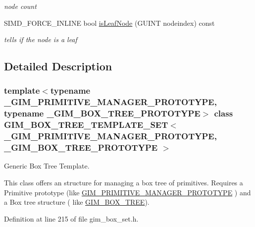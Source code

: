 \begin{Indent}{\bf }
\begin{CompactItemize}
\begin{CompactList}\small\item\em node count \item\end{CompactList}\item 
\hypertarget{class_g_i_m___b_o_x___t_r_e_e___t_e_m_p_l_a_t_e___s_e_t_509b1d5bf9af2486aae90e8d56993092}{
SIMD\_\-FORCE\_\-INLINE bool \hyperlink{class_g_i_m___b_o_x___t_r_e_e___t_e_m_p_l_a_t_e___s_e_t_509b1d5bf9af2486aae90e8d56993092}{isLeafNode} (GUINT nodeindex) const }
\label{class_g_i_m___b_o_x___t_r_e_e___t_e_m_p_l_a_t_e___s_e_t_509b1d5bf9af2486aae90e8d56993092}

\begin{CompactList}\small\item\em tells if the node is a leaf \item\end{CompactList}\end{CompactItemize}
\end{Indent}


\subsection{Detailed Description}
\subsubsection*{template$<$typename \_\-GIM\_\-PRIMITIVE\_\-MANAGER\_\-PROTOTYPE, typename \_\-GIM\_\-BOX\_\-TREE\_\-PROTOTYPE$>$ class GIM\_\-BOX\_\-TREE\_\-TEMPLATE\_\-SET$<$ \_\-GIM\_\-PRIMITIVE\_\-MANAGER\_\-PROTOTYPE, \_\-GIM\_\-BOX\_\-TREE\_\-PROTOTYPE $>$}

Generic Box Tree Template. 

This class offers an structure for managing a box tree of primitives. Requires a Primitive prototype (like \hyperlink{class_g_i_m___p_r_i_m_i_t_i_v_e___m_a_n_a_g_e_r___p_r_o_t_o_t_y_p_e}{GIM\_\-PRIMITIVE\_\-MANAGER\_\-PROTOTYPE} ) and a Box tree structure ( like \hyperlink{class_g_i_m___b_o_x___t_r_e_e}{GIM\_\-BOX\_\-TREE}). 

Definition at line 215 of file gim\_\-box\_\-set.h.

